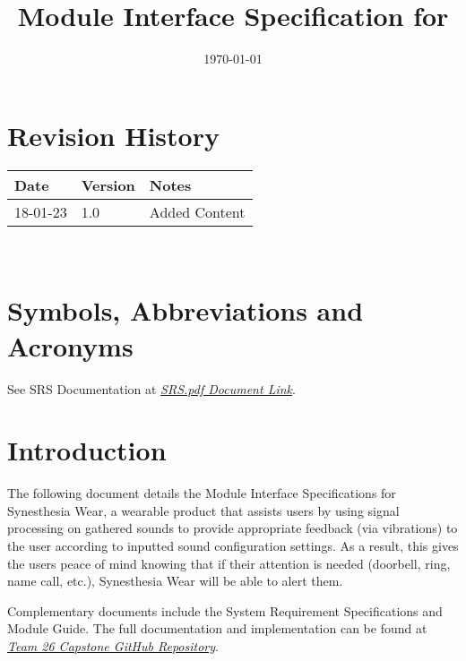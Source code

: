 \documentclass[12pt, titlepage]{article}
\begin{document}
\title{Module Interface Specification for \progname{}}

\author{\authname}

\date{\today}

\maketitle


\section*{Revision History}

\begin{tabularx}{\textwidth}{p{3cm}p{2cm}X}
\toprule {\bf Date} & {\bf Version} & {\bf Notes}\\
\midrule
18-01-23 & 1.0 & Added Content\\
\bottomrule
\end{tabularx}

~\newpage

\section*{Symbols, Abbreviations and Acronyms}

See SRS Documentation at  \href{https://github.com/jordanbierbrier/capstone/blob/main/docs/SRS/SRS.pdf}{\textit{SRS.pdf Document Link}}.


\newpage

\tableofcontents

\newpage


\section{Introduction}

The following document details the Module Interface Specifications for Synesthesia Wear, a wearable product that assists users by using signal processing on gathered sounds 
to provide appropriate feedback (via vibrations) to the user according to inputted sound configuration settings. As a result, this gives the users peace of mind knowing that if their attention 
is needed (doorbell, ring, name call, etc.), Synesthesia Wear will be able to alert them.


Complementary documents include the System Requirement Specifications
and Module Guide.  The full documentation and implementation can be
found at \href{https://github.com/jordanbierbrier/capstone}{\textit{Team 26 Capstone GitHub Repository}}.
\end{document}
